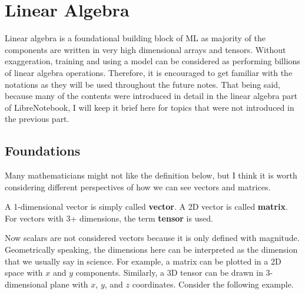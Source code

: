 \documentclass[../../../main.tex]{subfiles}
\begin{document}
\section{Linear Algebra}

Linear algebra is a foundational building block of ML as majority
of the components are written in very high dimensional arrays
and tensors. Without exaggeration, training and using a model
can be considered as performing billions of linear algebra
operations. Therefore, it is encouraged to get familiar with
the notations as they will be used throughout the future notes.
That being said, because many of the contents were introduced
in detail in the linear algebra part of LibreNotebook, I will
keep it brief here for topics that were not introduced in the
previous part.

\subsection{Foundations}

Many mathematicians might not like the definition below, but I think
it is worth considering different perspectives of how we can see
vectors and matrices.

\begin{definition}{}{}
A 1-dimensional vector is simply called \textbf{vector}. A 2D vector
is called \textbf{matrix}. For vectors with 3+ dimensions, the term
\textbf{tensor} is used.
\end{definition}

Now scalars are not considered vectors because it is only defined
with magnitude. Geometrically speaking, the dimensions here can be
interpreted as the dimension that we usually say in science.
For example, a matrix can be plotted in a 2D space with $x$ and $y$
components. Similarly, a 3D tensor can be drawn in 3-dimensional
plane with $x$, $y$, and $z$ coordinates. Consider the following
example.
\end{document}
